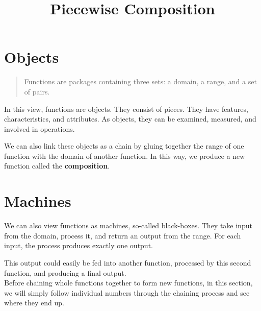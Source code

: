 \documentclass{ximera}
\title{Piecewise Composition}
\begin{document}
\begin{abstract}
\end{abstract}
\maketitle



\section*{Objects}


\begin{quote}
Functions are packages containing three sets: a domain, a range, and a set of pairs.
\end{quote}

In this view, functions are objects.  They consist of pieces. They have features, characteristics, and attributes.  As objects, they can be examined, measured, and involved in operations.


We can also link these objects as a chain by gluing together the range of one function with the domain of another function.  In this way, we produce a new function called the \textbf{composition}.












\section*{Machines}



We can also view functions as machines, so-called black-boxes.  They take input from the domain, process it, and return an output from the range.  For each input, the process produces exactly one output.



This output could easily be fed into another function, processed by this second function, and producing a final output. \\



Before chaining whole functions together to form new functions, in this section, we will simply follow individual numbers through the chaining process and see where they end up.
\end{document}
